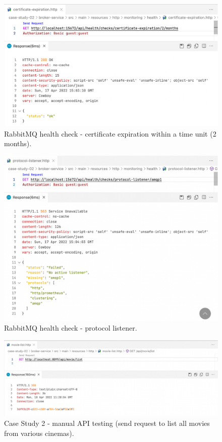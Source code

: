 \begin{figure}[H]
  \centering
  \includegraphics[width=1.0\linewidth]{./assets/images/case-study-02/cs02-hc3.png}
  \caption{RabbitMQ health check - certificate expiration within a time unit (2 months).}
  \label{fig:cs02-hc3}
\end{figure}

\begin{figure}[H]
  \centering
  \includegraphics[width=1.0\linewidth]{./assets/images/case-study-02/cs02-hc5.png}
  \caption{RabbitMQ health check - protocol listener.}
  \label{fig:cs02-hc5}
\end{figure}


\begin{figure}[H]
  \centering
  \includegraphics[width=1.0\linewidth]{./assets/images/case-study-02/cs02-manual-1.png}
  \caption{Case Study 2 - manual API testing (send request to list all movies from various cinemas).}
  \label{fig:cs02-manual-1}
\end{figure}

